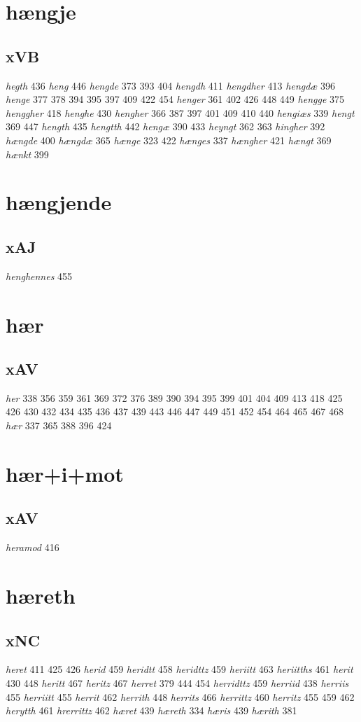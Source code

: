 \documentclass[a4paper,twocolumn]{article}
\begin{document}
\section{hængje}
\label{sec:org9727591}
\subsection{xVB}
\label{sec:orga042106}
\emph{hegth} 436 \emph{heng} 446 \emph{hengde} 373 393 404 \emph{hengdh} 411 \emph{hengdher} 413 \emph{hengdæ} 396 \emph{henge} 377 378 394 395 397 409 422 454 \emph{henger} 361 402 426 448 449 \emph{hengge} 375 \emph{henggher} 418 \emph{henghe} 430 \emph{hengher} 366 387 397 401 409 410 440 \emph{hengiæs} 339 \emph{hengt} 369 447 \emph{hength} 435 \emph{hengtth} 442 \emph{hengæ} 390 433 \emph{heyngt} 362 363 \emph{hingher} 392 \emph{hængde} 400 \emph{hængdæ} 365 \emph{hænge} 323 422 \emph{hænges} 337 \emph{hængher} 421 \emph{hængt} 369 \emph{hænkt} 399 
\section{hængjende}
\label{sec:orga329e46}
\subsection{xAJ}
\label{sec:org3b9bdd1}
\emph{henghennes} 455 
\section{hær}
\label{sec:org1c676a4}
\subsection{xAV}
\label{sec:orgd29fedf}
\emph{her} 338 356 359 361 369 372 376 389 390 394 395 399 401 404 409 413 418 425 426 430 432 434 435 436 437 439 443 446 447 449 451 452 454 464 465 467 468 \emph{hær} 337 365 388 396 424 
\section{hær+i+mot}
\label{sec:org09d699c}
\subsection{xAV}
\label{sec:org9c4bc31}
\emph{heramod} 416 
\section{hæreth}
\label{sec:orgb0eb3e3}
\subsection{xNC}
\label{sec:org8c30c2a}
\emph{heret} 411 425 426 \emph{herid} 459 \emph{heridtt} 458 \emph{heridttz} 459 \emph{heriitt} 463 \emph{heriitths} 461 \emph{herit} 430 448 \emph{heritt} 467 \emph{heritz} 467 \emph{herret} 379 444 454 \emph{herridttz} 459 \emph{herriid} 438 \emph{herriis} 455 \emph{herriitt} 455 \emph{herrit} 462 \emph{herrith} 448 \emph{herrits} 466 \emph{herrittz} 460 \emph{herritz} 455 459 462 \emph{herytth} 461 \emph{hrerrittz} 462 \emph{hæret} 439 \emph{hæreth} 334 \emph{hæris} 439 \emph{hærith} 381 
\end{document}
